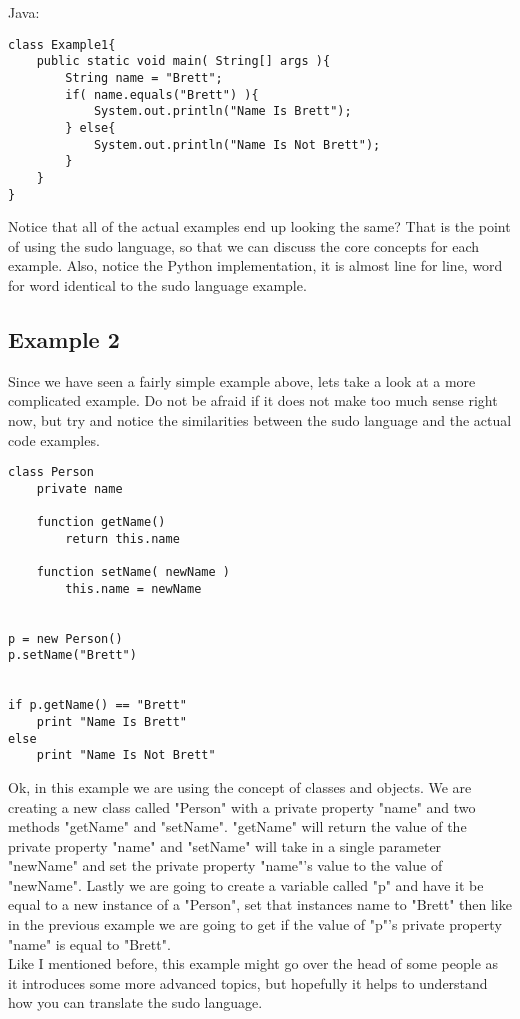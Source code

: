Java:
\begin{lstlisting}
class Example1{
    public static void main( String[] args ){
        String name = "Brett";
        if( name.equals("Brett") ){
            System.out.println("Name Is Brett");
        } else{
            System.out.println("Name Is Not Brett");
        }
    }
}
\end{lstlisting}

Notice that all of the actual examples end up looking the same? That is the point of using the sudo language, so that we can
discuss the core concepts for each example. Also, notice the Python implementation, it is almost line for line, word for word
identical to the sudo language example.

\subsection{Example 2}
Since we have seen a fairly simple example above, lets take a look at a more complicated example. Do not be afraid if it does not make
too much sense right now, but try and notice the similarities between the sudo language and the actual code examples.

\begin{lstlisting}
class Person
    private name
    
    function getName()
        return this.name
    
    function setName( newName )
        this.name = newName


p = new Person()
p.setName("Brett")


if p.getName() == "Brett"
    print "Name Is Brett"
else
    print "Name Is Not Brett"
\end{lstlisting}

Ok, in this example we are using the concept of classes and objects. We are creating a new class called "Person" with a
private property "name" and two methods "getName" and "setName". "getName" will return the value of the private property "name" and
"setName" will take in a single parameter "newName" and set the private property "name"'s value to the value of "newName". Lastly we
are going to create a variable called "p" and have it be equal to a new instance of a "Person", set that instances name to "Brett" then like 
in the previous example we are going to get if the value of "p"'s private property "name" is equal to "Brett".
\newline
\\
Like I mentioned before, this example might go over the head of some people as it introduces some more advanced topics, but hopefully it
helps to understand how you can translate the sudo language.

